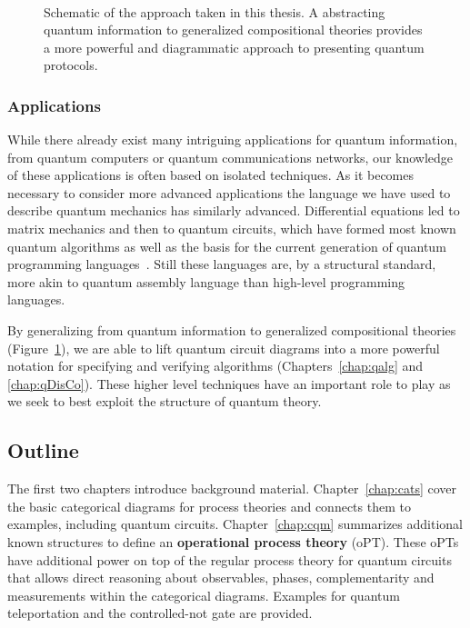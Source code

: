 \begin{figure}[t]
\label{fig:overview}
\begin{align*}

\end{align*}
\caption[Schematic of generalized compositional theories and categorical diagrams.]{Schematic of the approach taken in this thesis. A abstracting quantum information to generalized compositional theories provides a more powerful and diagrammatic approach to presenting quantum protocols.}
\end{figure}


\subsubsection*{Applications} While there already exist many intriguing applications for quantum information, from quantum computers or quantum communications networks, our knowledge of these applications is often based on isolated techniques. As it becomes necessary to consider more advanced applications the language we have used to describe quantum mechanics has similarly advanced. Differential equations led to matrix mechanics and then to quantum circuits, which have formed most known quantum algorithms as well as the basis for the current generation of quantum programming languages~\cite{green2013quipper,wecker2014liqui}. Still these languages are, by a structural standard, more akin to quantum assembly language than high-level programming languages. 

By generalizing from quantum information to generalized compositional theories (Figure~\ref{fig:overview}), we are able to lift quantum circuit diagrams into a more powerful notation for specifying and verifying algorithms (Chapters~\ref{chap:qalg} and \ref{chap:qDisCo}). These higher level techniques have an important role to play as we seek to best exploit the structure of quantum theory. 

\subsection*{Outline}

The first two chapters introduce background material. Chapter~\ref{chap:cats} cover the basic categorical diagrams for process theories and connects them to examples, including quantum circuits. Chapter~\ref{chap:cqm} summarizes additional known structures to define an \textbf{operational process theory} (oPT). These oPTs have additional power on top of the regular process theory for quantum circuits that allows direct reasoning about observables, phases, complementarity and measurements within the categorical diagrams. Examples for quantum teleportation and the controlled-not gate are provided.

